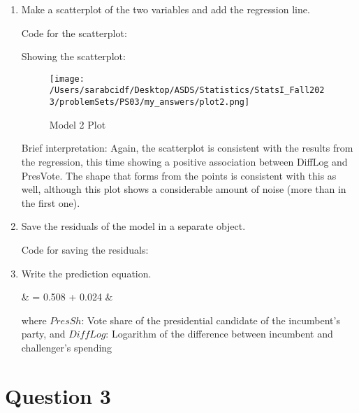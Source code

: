 \documentclass[12pt,letterpaper]{article}
\begin{document}
\begin{enumerate}
		\item Make a scatterplot of the two variables and add the regression line. \vspace{0.25cm}
		
		Code for the scatterplot: 
		
		
		Showing the scatterplot: 
		\begin{figure}[H]
			\centering
			\texttt{[image: /Users/sarabcidf/Desktop/ASDS/Statistics/StatsI\_Fall2023/problemSets/PS03/my\_answers/plot2.png]}
			\caption{Model 2 Plot}
		\end{figure}
		
		Brief interpretation: 
		Again, the scatterplot is consistent with the results from the regression, this time showing a positive association between DiffLog and PresVote. The shape that forms from the points is consistent with this as well, although this plot shows a considerable amount of noise (more than in the first one).
		
		\item Save the residuals of the model in a separate object.	\vspace{0.25cm}
		
		Code for saving the residuals: 
		
		
		\item Write the prediction equation.
		
		{\setlength{\abovedisplayskip}{2pt} 
			\setlength{\belowdisplayskip}{6pt} 
			
			\begin{flalign*}
				& = 0.508 + 0.024 \cdot {}  &
			\end{flalign*}
			
			where $PresSh$: Vote share of the presidential candidate of the incumbent's party, and $DiffLog$: Logarithm of the difference between incumbent and challenger's spending
		} 
		
	\end{enumerate}
	
	\newpage	
\section*{Question 3}
\end{document}
